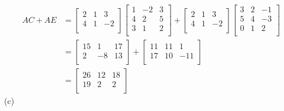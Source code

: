 \documentclass{article}
\begin{document}
\begin{align*}
    AC+AE &= 
    \begin{bmatrix}
        2 & 1 & 3\\
        4 & 1 & -2\\
    \end{bmatrix}
    \begin{bmatrix}
        1 & -2 & 3\\
        4 & 2 & 5\\
        3 & 1 & 2\\
    \end{bmatrix}
    +
    \begin{bmatrix}
        2 & 1 & 3\\
        4 & 1 & -2\\
    \end{bmatrix}
    \begin{bmatrix}
        3 & 2 & -1\\
        5 & 4 & -3\\
        0 & 1 & 2\\
    \end{bmatrix}\\
    &=
    \begin{bmatrix}
        15 & 1 & 17\\
        2 & -8 & 13\\
    \end{bmatrix}
    +
    \begin{bmatrix}
        11 & 11 & 1\\
        17 & 10 & -11\\
    \end{bmatrix}\\
    &=
    \begin{bmatrix}
        26 & 12 & 18\\
        19 & 2 & 2\\
    \end{bmatrix}
\end{align*}
(c)
\end{document}
